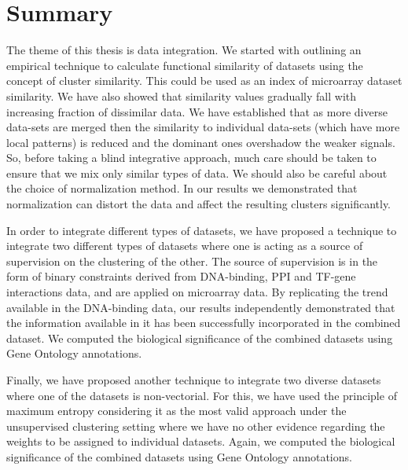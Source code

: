 \section{Summary}
The theme of this thesis is data integration. We started with outlining an empirical technique to calculate functional similarity of datasets using the concept of cluster similarity. This could be used as an index of microarray dataset similarity. We have also showed that similarity values gradually fall with increasing fraction of dissimilar data. We have established that as more diverse data-sets are merged then the similarity to individual data-sets (which have more local patterns) is reduced and the dominant ones overshadow the weaker signals. So, before taking a blind integrative approach, much care should be taken to ensure that we mix only similar types of data. We should also be careful about the choice of normalization method. In our results we demonstrated that normalization can distort the data and affect the resulting clusters significantly.

In order to integrate different types of datasets, we have proposed a technique to integrate two different types of  datasets where one is acting as a source of supervision on the clustering of the other. The source of supervision is in the form of binary constraints derived from DNA-binding, PPI and TF-gene interactions data, and are applied on microarray data. By replicating the trend available in the DNA-binding data, our results independently demonstrated that the information available in it has been successfully incorporated in the combined dataset. We computed the biological significance of the combined datasets using Gene Ontology annotations. 

Finally, we have proposed another technique to integrate two diverse datasets where one of the datasets is non-vectorial. For this, we have used the principle of maximum entropy considering it as the most valid approach under the unsupervised clustering setting where we have no other evidence regarding the weights to be assigned to individual datasets. Again, we computed the biological significance of the combined datasets using Gene Ontology annotations. 

